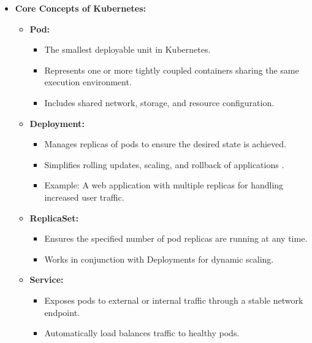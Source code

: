 \documentclass[conference]{IEEEtran}
\begin{document}
\begin{itemize}
    \item \textbf{Core Concepts of Kubernetes:}
    \begin{itemize}
        \item \textbf{Pod:}
        \begin{itemize}
            \item The smallest deployable unit in Kubernetes.
            \item Represents one or more tightly coupled containers sharing the same execution environment.
            \item Includes shared network, storage, and resource configuration.
        \end{itemize}
        \item \textbf{Deployment:}
        \begin{itemize}
            \item Manages replicas of pods to ensure the desired state is achieved.
            \item Simplifies rolling updates, scaling, and rollback of applications \cite{kubernetesDeployment}.
            \item Example: A web application with multiple replicas for handling increased user traffic.
        \end{itemize}
        \item \textbf{ReplicaSet:}
        \begin{itemize}
            \item Ensures the specified number of pod replicas are running at any time.
            \item Works in conjunction with Deployments for dynamic scaling.
        \end{itemize}
        \item \textbf{Service:}
        \begin{itemize}
            \item Exposes pods to external or internal traffic through a stable network endpoint.
            \item Automatically load balances traffic to healthy pods.
        \end{itemize}
    \end{itemize}
    

\end{itemize}
\end{document}
